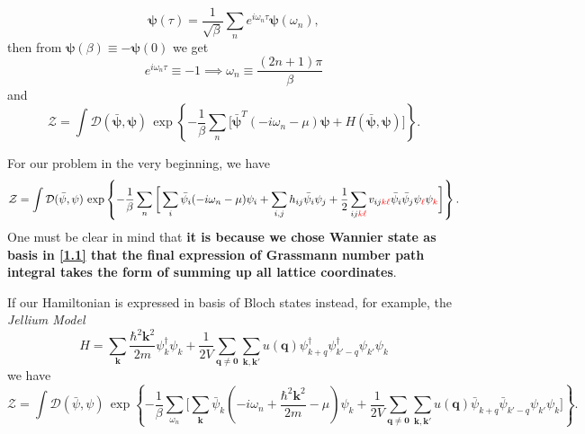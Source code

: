 \documentclass[10pt,nofootinbib]{revtex4}
\begin{document}
	\begin{equation*}
		\bm{\psi}(\tau)=\dfrac{1}{\sqrt{\beta}}\sum_n e^{i\omega_n\tau}\bm{\psi}(\omega_n),
	\end{equation*}
	then from $\bm{\psi}(\beta)\equiv-\bm{\psi}(0)$ we get
	\begin{equation*}
		e^{i\omega_n \tau}\equiv-1\implies \omega_n\equiv\dfrac{(2n+1)\pi}{\beta}
	\end{equation*}
	and 
	\begin{equation}\label{2.9}
		\mathcal{Z}=\int\mathcal{D}(\bm{\bar\psi},\bm{\psi})\,\exp\left\{-\dfrac{1}{\beta}\sum_n\bigg[\bm{\bar\psi}^T(-i\omega_n-\mu)\bm{\psi}+H(\bm{\bar\psi},\bm{\psi})\bigg]\right\}.
	\end{equation}
	
	For our problem in the very beginning, we have
	\begin{equation}\label{2.10}
		\mathcal{Z}=\int\mathcal{D}(\bar\psi,\psi)\,\exp\left\{-\dfrac{1}{\beta}\sum_n\bigg[\sum_i\bar\psi_i(-i\omega_n-\mu)\psi_i+\sum_{i,j}h_{ij}\bar\psi_i\psi_j+\dfrac{1}{2}\sum_{ij{\color{red}k\ell}}v_{ij{\color{red}k\ell}}\bar\psi_i\bar\psi_j \psi_{\color{red}\ell} \psi_{\color{red}k}\bigg]\right\}.
	\end{equation}
	One must be clear in mind that \textbf{it is because we chose Wannier state as basis in \eqref{1.1} that the final expression of Grassmann number path integral takes the form of summing up all lattice coordinates}.\par
	\noindent If our Hamiltonian is expressed in basis of Bloch states instead, for example, the \emph{Jellium Model}
	\begin{equation*}
		H=\sum_{\bm{k}}\dfrac{\hbar^2\bm{k}^2}{2m}\psi_k^\dagger\psi_k+\dfrac{1}{2V}\sum_{\bm{q\neq0}}\sum_{\bm{k,k'}}u(\bm{q})\psi_{k+q}^\dagger\psi_{k'-q}^\dagger\psi_{k'}\psi_k
	\end{equation*}
	we have
	\begin{equation}\label{2.11}
		\mathcal{Z}=\int\mathcal{D}(\bar\psi,\psi)\,\exp\left\{-\dfrac{1}{\beta}\sum_{\omega_n}\bigg[\sum_{\bm{k}}\bar\psi_k\left(-i\omega_n+\dfrac{\hbar^2\bm{k}^2}{2m}-\mu\right)\psi_k+\dfrac{1}{2V}\sum_{\bm{q\neq0}}\sum_{\bm{k,k'}}u(\bm{q})\bar\psi_{k+q}\bar\psi_{k'-q}\psi_{k'}\psi_k\bigg]\right\}.
	\end{equation}
\end{document}

